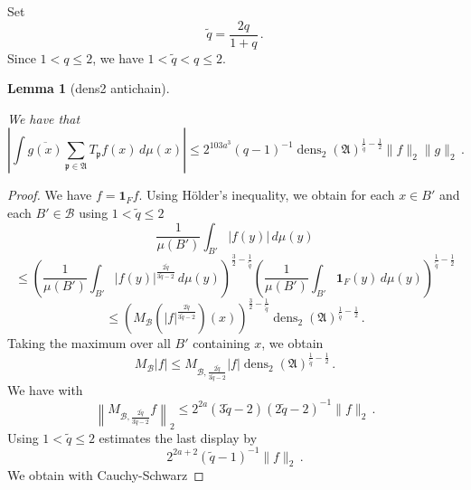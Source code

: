 \documentclass[10pt,a4paper]{article}
\theoremstyle{plain}
\newtheorem{lemma}[theorem]{Lemma}
\theoremstyle{definition}
\numberwithin{equation}{subsection}
\DeclareMathOperator{\dens}{\operatorname{dens}}
\newcommand{\fp}{{\mathfrak p}}
\newcommand{\lean}[1]{}
\newcommand{\uses}[1]{}
\newcommand{\leanok}{}
\begin{document}
Set
\begin{equation}
    \tilde{q}=\frac {2q}{1+q}\,.
\end{equation}
Since $1< q\le 2$, we have $1<\tilde{q}<q\le 2$.
\begin{lemma}[dens2 antichain]
\label{dens2-antichain}
\uses{Hardy-Littlewood,maximal-bound-antichain}
\leanok
\lean{dens2_antichain}
We have that
\begin{equation}\label{eqttt9}
  \left|\int \overline{g(x)} \sum_{\fp \in \mathfrak{A}} T_{\fp} f(x)\, d\mu(x)\right|\le
  2^{103a^3}({q}-1)^{-1} \dens_2(\mathfrak{A})^{\frac 1{\tilde{q}}-\frac 12} \|f\|_2\|g\|_2\, .
\end{equation}
\end{lemma}
\begin{proof}
\leanok
We have $f=\mathbf{1}_Ff$. Using H\"older's inequality, we obtain for
each $x\in B'$ and each $B'\in \mathcal{B}$ using $1<\tilde{q}\le 2$
\begin{equation}
    \frac 1{\mu(B')}\int_{B'} |f(y)|\, d\mu(y)
\end{equation}
\begin{equation}
    \le
    \left(\frac 1{\mu(B')}\int_{B'} |f(y)|^{\frac {2{\tilde{q}}}{3\tilde{q}-2}}\, d\mu(y)\right)^{\frac 32-\frac 1{\tilde{q}}}
    \left(\frac 1{\mu(B')}\int_{B'} \mathbf{1}_F(y)\, d\mu(y)\right)^{\frac 1{\tilde{q}}-\frac 12}
\end{equation}
\begin{equation}
    \le \left(M_{\mathcal{B}} (|f|^{\frac {2{\tilde{q}}}{3{\tilde{q}}-2}})(x)\right)^{\frac 32-\frac 1{\tilde{q}}}
\dens_2(\mathfrak{A})^{\frac 1{\tilde{q}}-\frac 12}\, .
\end{equation}
Taking the maximum over all $B'$ containing $x$, we obtain
\begin{equation} \label{eqttt1}
    M_{\mathcal{B}}|f|\le
    M_{\mathcal{B},\frac {2{\tilde{q}}}{3{\tilde{q}}-2} } |f|
    \dens_2(\mathfrak{A})^{\frac 1{\tilde{q}}-\frac 12}\, .
\end{equation}
We have with 
\begin{equation}
\left\|M_{\mathcal{B}, \frac {2{\tilde{q}}}{3{\tilde{q}}-2}} f\right\|_2\le 2^{2a}(3\tilde{q}-2)(2\tilde{q}-2)^{-1}\|f\|_2\, .
\end{equation}
Using $1<\tilde{q}\le 2$ estimates the last display by
\begin{equation}\label{eqttt2}
 2^{2a+2} (\tilde{q}-1)^{-1} \|f\|_2\, .
\end{equation}
We obtain with Cauchy-Schwarz

\end{proof}
\end{document}
